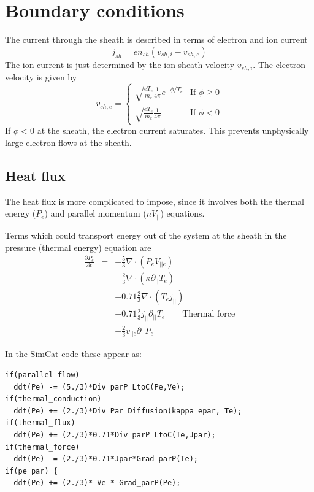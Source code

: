 \documentclass[12pt,a4paper]{article}
\begin{document}
\section{Boundary conditions}
\label{sec:boundary}

The current through the sheath is described in terms of electron and ion current
\[
j_{sh} = en_{sh}\left(v_{sh,i} - v_{sh,e}\right)
\]
The ion current is just determined by the ion sheath velocity $v_{sh,i}$.
The electron velocity is given by
\begin{equation}
v_{sh,e} = \left\{\begin{array}{ll}
  \sqrt{\frac{eT_e}{m_e}\frac{1}{4\pi}}e^{-\phi/T_e} & \textrm{If $\phi \ge 0$} \\
  \sqrt{\frac{eT_e}{m_e}\frac{1}{4\pi}} & \textrm{If $\phi < 0$}
\end{array}\right.
\end{equation}
If $\phi < 0$ at the sheath, the electron current saturates. This
prevents unphysically large electron flows at the sheath.

\subsection{Heat flux}

The heat flux is more complicated to impose, since it involves both the thermal energy ($P_e$) and parallel momentum ($nV_{||}$) equations.

Terms which could transport energy out of the system at the sheath in the pressure (thermal energy) equation are
\begin{eqnarray}
  \frac{\partial P_e}{\partial t} &=& -\frac{5}{3}\nabla\cdot\left(P_eV_{||e}\right) \\
  && + \frac{2}{3}\nabla\cdot\left(\kappa\partial_{||}T_e\right) \\
  && + 0.71 \frac{2}{3} \nabla\cdot\left(T_ej_{||}\right) \\
  && - 0.71 \frac{2}{3} j_{||} \partial_{||}T_e \qquad \textrm{Thermal force} \\
  && + \frac{2}{3} v_{||e}\partial_{||} P_e
\end{eqnarray}

In the SimCat code these appear as:
\begin{verbatim}
if(parallel_flow)
  ddt(Pe) -= (5./3)*Div_parP_LtoC(Pe,Ve);
if(thermal_conduction)
  ddt(Pe) += (2./3)*Div_Par_Diffusion(kappa_epar, Te);
if(thermal_flux)
  ddt(Pe) += (2./3)*0.71*Div_parP_LtoC(Te,Jpar);
if(thermal_force)
  ddt(Pe) -= (2./3)*0.71*Jpar*Grad_parP(Te);
if(pe_par) {
  ddt(Pe) += (2./3)* Ve * Grad_parP(Pe);
\end{verbatim}
\end{document}
